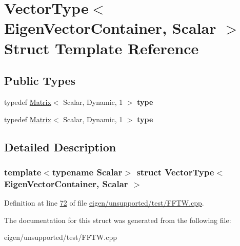 \hypertarget{struct_vector_type_3_01_eigen_vector_container_00_01_scalar_01_4}{}\section{Vector\+Type$<$ Eigen\+Vector\+Container, Scalar $>$ Struct Template Reference}
\label{struct_vector_type_3_01_eigen_vector_container_00_01_scalar_01_4}
\subsection*{Public Types}
\begin{DoxyCompactItemize}
\item 
\mbox{\label{struct_vector_type_3_01_eigen_vector_container_00_01_scalar_01_4_a86c935e8e2a1ad5b352a40cec1e04d8b}} 
typedef \hyperlink{group___core___module_class_eigen_1_1_matrix}{Matrix}$<$ Scalar, Dynamic, 1 $>$ {\bfseries type}
\item 
\mbox{\label{struct_vector_type_3_01_eigen_vector_container_00_01_scalar_01_4_a86c935e8e2a1ad5b352a40cec1e04d8b}} 
typedef \hyperlink{group___core___module_class_eigen_1_1_matrix}{Matrix}$<$ Scalar, Dynamic, 1 $>$ {\bfseries type}
\end{DoxyCompactItemize}


\subsection{Detailed Description}
\subsubsection*{template$<$typename Scalar$>$\newline
struct Vector\+Type$<$ Eigen\+Vector\+Container, Scalar $>$}



Definition at line \hyperlink{eigen_2unsupported_2test_2_f_f_t_w_8cpp_source_l00072}{72} of file \hyperlink{eigen_2unsupported_2test_2_f_f_t_w_8cpp_source}{eigen/unsupported/test/\+F\+F\+T\+W.\+cpp}.



The documentation for this struct was generated from the following file\+:\begin{DoxyCompactItemize}
\item 
eigen/unsupported/test/\+F\+F\+T\+W.\+cpp\end{DoxyCompactItemize}
